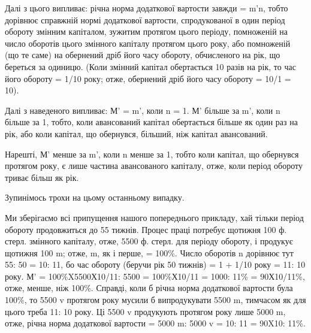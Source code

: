 \parcont{}  %
Далі з цього випливає: річна норма додаткової вартости завжди =
m'n, тобто дорівнює справжній нормі додаткової вартости, спродукованої
в один період обороту змінним капіталом, зужитим протягом цього
періоду, помноженій на число оборотів цього змінного капіталу протягом
цього року, або помноженій (що те саме) на обернений дріб його часу
обороту, обчисленого на рік, що береться за одиницю. (Коли
змінний капітал обертається 10 разів на рік, то час його обороту = 1/10 року;
отже, обернений дріб його часу обороту = 10/1 = 10).

Далі з наведеного випливає: М' = m', коли n = 1. М' більше за m',
коли n більше за 1, тобто, коли авансований капітал обертається більше
як один раз на рік, або коли капітал, що обернувся, більший, ніж капітал
авансований.

Нарешті, М' менше за m', коли n менше за 1, тобто коли капітал,
що обернувся протягом року, є лише частина авансованого капіталу, отже,
коли період обороту триває більш як рік.

Зупинімось трохи на цьому останньому випадку.

Ми зберігаємо всі припущення нашого попереднього прикладу, хай
тільки період обороту продовжиться до 55 тижнів. Процес праці потребує
щотижня 100 ф. стерл. змінного капіталу, отже, 5500 ф. стерл. для періоду
обороту, і продукує щотижня 100 m; отже, m, як і перше, = 100\%.
Число оборотів n дорівнює тут 55: 50 = 10: 11, бо час обороту (беручи рік
50 тижнів) = 1 + 1/10 року = 11: 10 року. М' = 100\%X5500Х10/11: 5500 =
100\%Х10/11 = 1000: 11\% = 90Х10/11\%, отже, менше, ніж 100\%. Справді,
коли б річна норма додаткової вартости була 100\%, то 5500 v протягом
року мусили б випродукувати 5500 m, тимчасом як для цього треба 11: 10
року. Ці 5500 v продукують протягом року лише 5000 m, отже, річна
норма додаткової вартости = 5000 m: 5000 v = 10: 11 = 90X10: 11\%.

